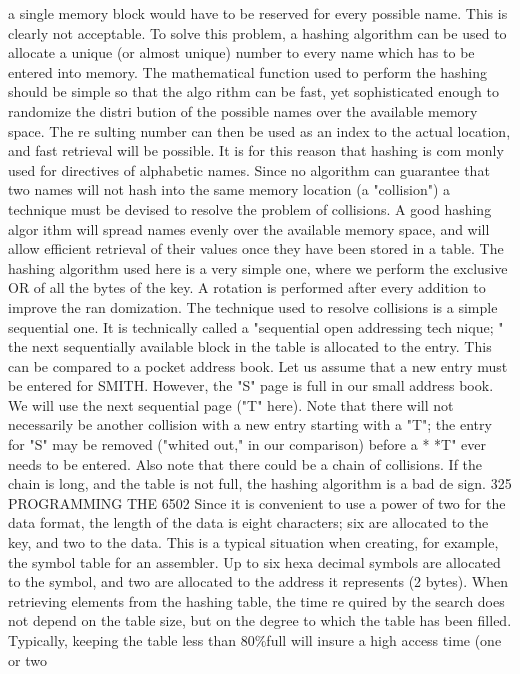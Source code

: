 \documentclass{book}
\begin{document}
{{{{{{{{{{{{{{{{{{{{{{{{{{{{{{{{{{{{{{{{{{{{{{{{{{{{{{{{{{{{{{{{{{{{{{{{{{{{{{{{{{{{{{{{{{a single memory block would have to be reserved for every possible
name. This is clearly not acceptable. To solve this problem, a hashing
algorithm can be used to allocate a unique (or almost unique) number
to every name which has to be entered into memory. The mathematical
function used to perform the hashing should be simple so that the algo
rithm can be fast, yet sophisticated enough to randomize the distri
bution of the possible names over the available memory space. The re
sulting number can then be used as an index to the actual location, and
fast retrieval will be possible. It is for this reason that hashing is com
monly used for directives of alphabetic names.
Since no algorithm can guarantee that two names will not hash
into the same memory location (a "collision") a technique must be
devised to resolve the problem of collisions. A good hashing algor
ithm will spread names evenly over the available memory space,
and will allow efficient retrieval of their values once they have been
stored in a table. The hashing algorithm used here is a very simple
one, where we perform the exclusive OR of all the bytes of the key.
A rotation is performed after every addition to improve the ran
domization.
The technique used to resolve collisions is a simple sequential
one. It is technically called a "sequential open addressing tech
nique; " the next sequentially available block in the table is
allocated to the entry. This can be compared to a pocket address
book. Let us assume that a new entry must be entered for SMITH.
However, the "S" page is full in our small address book. We will
use the next sequential page ("T" here). Note that there will not
necessarily be another collision with a new entry starting with a "T";
the entry for "S" may be removed ("whited out," in our comparison)
before a * *T" ever needs to be entered.
Also note that there could be a chain of collisions. If the chain is
long, and the table is not full, the hashing algorithm is a bad de
sign.
325
PROGRAMMING THE 6502
Since it is convenient to use a power of two for the data format,
the length of the data is eight characters; six are allocated to the
key, and two to the data. This is a typical situation when creating,
for example, the symbol table for an assembler. Up to six hexa
decimal symbols are allocated to the symbol, and two are allocated
to the address it represents (2 bytes).
When retrieving elements from the hashing table, the time re
quired by the search does not depend on the table size, but on the
degree to which the table has been filled. Typically, keeping the
table less than 80\%full will insure a high access time (one or two
}}}}}}}}}}}}}}}}}}}}}}}}}}}}}}}}}}}}}}}}}}}}}}}}}}}}}}}}}}}}}}}}}}}}}}}}}}}}}}}}}}}}}}}}}}
\end{document}
